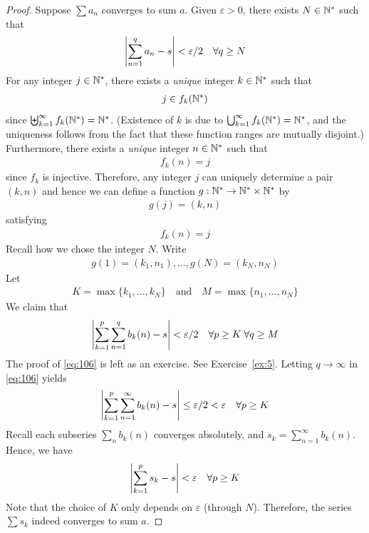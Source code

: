 \documentclass[thmcnt=section, 12pt]{my-elegantbook}
\begin{document}
\begin{proof}
    Suppose $\sum a_n$ converges to sum $a$. Given $\varepsilon > 0$, there exists $N \in \mathbb{N}^\ast$ such that
    \begin{align}
        \left\lvert \sum_{n=1}^q a_n - s \right\rvert < \varepsilon / 2
        \quad \forall q \geq N
        \label{eq:107}
    \end{align}
    For any integer $j \in \mathbb{N}^\ast$, there exists a \textit{unique} integer $k \in \mathbb{N}^\ast$ such that
    \begin{align*}
        j \in f_k(\mathbb{N}^\ast)
    \end{align*}
    since $\biguplus_{k=1}^\infty f_k(\mathbb{N}^\ast) = \mathbb{N}^\ast$. (Existence of $k$ is due to $\bigcup_{k=1}^\infty f_k(\mathbb{N}^\ast) = \mathbb{N}^\ast$, and the uniqueness follows from the fact that these function ranges are mutually disjoint.) Furthermore, there exists a \textit{unique} integer $n \in \mathbb{N}^\ast$ such that
    \begin{align*}
        f_k(n) = j
    \end{align*}
    since $f_k$ is injective. Therefore, any integer $j$ can uniquely determine a pair $(k, n)$ and hence we can define a function $g: \mathbb{N}^\ast \to \mathbb{N}^\ast \times \mathbb{N}^\ast$ by
    \begin{align*}
        g(j) = (k, n)
    \end{align*}
    satisfying
    \begin{align*}
        f_k(n) = j
    \end{align*}
    Recall how we chose the integer $N$. Write
    \begin{align*}
        g(1) = (k_1, n_1), \ldots, g(N) = (k_N, n_N)
    \end{align*}
    Let
    \begin{align*}
        K = \max \{ k_1, \ldots, k_N \}
        \quad \text{and} \quad
        M = \max \{ n_1, \ldots, n_N \}
    \end{align*}
    We claim that
    \begin{align}
        \left\lvert \sum_{k=1}^p \sum_{n=1}^q b_k(n) - s \right\rvert < \varepsilon / 2
        \quad \forall p \geq K \;
        \forall q \geq M
        \label{eq:106}
    \end{align}
    The proof of \eqref{eq:106} is left as an exercise. See Exercise~\ref{ex:5}. Letting $q \to \infty$ in \eqref{eq:106} yields
    \begin{align*}
        \left\lvert \sum_{k=1}^p \sum_{n=1}^\infty b_k(n) - s \right\rvert \leq \varepsilon / 2 < \varepsilon
        \quad \forall p \geq K
    \end{align*}
    Recall each subseries $\sum_n b_k(n)$ converges absolutely, and $s_k = \sum_{n=1}^\infty b_k(n)$. Hence, we have
    \begin{align*}
        \left\lvert \sum_{k=1}^p s_k - s \right\rvert
        < \varepsilon
        \quad \forall p \geq K
    \end{align*}
    Note that the choice of $K$ only depends on $\varepsilon$ (through $N$). Therefore, the series $\sum s_k$ indeed converges to sum $a$.
\end{proof}
\end{document}
